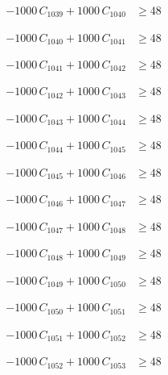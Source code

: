 \documentclass[a4paper,11pt]{article}
\begin{document}
\begin{align}
-1000\,C_{1039} + 1000\,C_{1040} &\geq 48 \nonumber
\end{align}

\begin{align}
-1000\,C_{1040} + 1000\,C_{1041} &\geq 48 \nonumber
\end{align}

\begin{align}
-1000\,C_{1041} + 1000\,C_{1042} &\geq 48 \nonumber
\end{align}

\begin{align}
-1000\,C_{1042} + 1000\,C_{1043} &\geq 48 \nonumber
\end{align}

\begin{align}
-1000\,C_{1043} + 1000\,C_{1044} &\geq 48 \nonumber
\end{align}

\begin{align}
-1000\,C_{1044} + 1000\,C_{1045} &\geq 48 \nonumber
\end{align}

\begin{align}
-1000\,C_{1045} + 1000\,C_{1046} &\geq 48 \nonumber
\end{align}

\begin{align}
-1000\,C_{1046} + 1000\,C_{1047} &\geq 48 \nonumber
\end{align}

\begin{align}
-1000\,C_{1047} + 1000\,C_{1048} &\geq 48 \nonumber
\end{align}

\begin{align}
-1000\,C_{1048} + 1000\,C_{1049} &\geq 48 \nonumber
\end{align}

\begin{align}
-1000\,C_{1049} + 1000\,C_{1050} &\geq 48 \nonumber
\end{align}

\begin{align}
-1000\,C_{1050} + 1000\,C_{1051} &\geq 48 \nonumber
\end{align}

\begin{align}
-1000\,C_{1051} + 1000\,C_{1052} &\geq 48 \nonumber
\end{align}

\begin{align}
-1000\,C_{1052} + 1000\,C_{1053} &\geq 48 \nonumber
\end{align}
\end{document}
